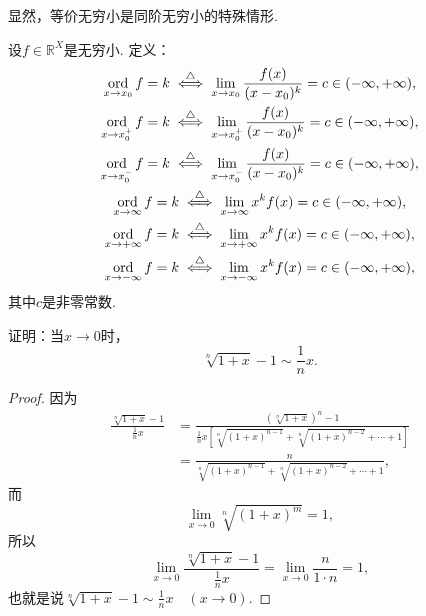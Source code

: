 \begin{remark}
显然，等价无穷小是同阶无穷小的特殊情形.
\end{remark}

\begin{definition}
设\(f\in\mathbb{R}^X\)是无穷小.
定义：\begin{gather*}
	\operatorname*{ord}_{x \to x_0} f = k
	\overset{\triangle}{\iff}
	\lim_{x \to x_0} \frac{f(x)}{(x-x_0)^k} = c \in (-\infty,+\infty), \\
	\operatorname*{ord}_{x \to x_0^+} f = k
	\overset{\triangle}{\iff}
	\lim_{x \to x_0^+} \frac{f(x)}{(x-x_0)^k} = c \in (-\infty,+\infty), \\
	\operatorname*{ord}_{x \to x_0^-} f = k
	\overset{\triangle}{\iff}
	\lim_{x \to x_0^-} \frac{f(x)}{(x-x_0)^k} = c \in (-\infty,+\infty), \\
	\operatorname*{ord}_{x \to \infty} f = k
	\overset{\triangle}{\iff}
	\lim_{x \to \infty} x^k f(x) = c \in (-\infty,+\infty), \\
	\operatorname*{ord}_{x \to +\infty} f = k
	\overset{\triangle}{\iff}
	\lim_{x \to +\infty} x^k f(x) = c \in (-\infty,+\infty), \\
	\operatorname*{ord}_{x \to -\infty} f = k
	\overset{\triangle}{\iff}
	\lim_{x \to -\infty} x^k f(x) = c \in (-\infty,+\infty),
\end{gather*}
其中\(c\)是非零常数.
\end{definition}

\begin{example}
证明：当\(x\to0\)时，\begin{equation}
	\sqrt[n]{1+x} - 1 \sim \frac1n x.
\end{equation}
\begin{proof}
因为\begin{align*}
	\frac{\sqrt[n]{1+x} - 1}{\frac1n x}
	&= \frac{(\sqrt[n]{1+x})^n - 1}{\frac1n x \left[ \sqrt[n]{(1+x)^{n-1}} + \sqrt[n]{(1+x)^{n-2}} + \dotsb + 1 \right]} \\
	&= \frac{n}{\sqrt[n]{(1+x)^{n-1}} + \sqrt[n]{(1+x)^{n-2}} + \dotsb + 1},
\end{align*}
而\[
	\lim_{x\to0} \sqrt[n]{(1+x)^m} = 1,
\]
所以\[
	\lim_{x\to0} \frac{\sqrt[n]{1+x} - 1}{\frac1n x} = \lim_{x\to0} \frac{n}{1 \cdot n} = 1,
\]
也就是说\(\sqrt[n]{1+x} - 1 \sim \frac1n x \quad(x\to0)\).
\end{proof}
\end{example}

